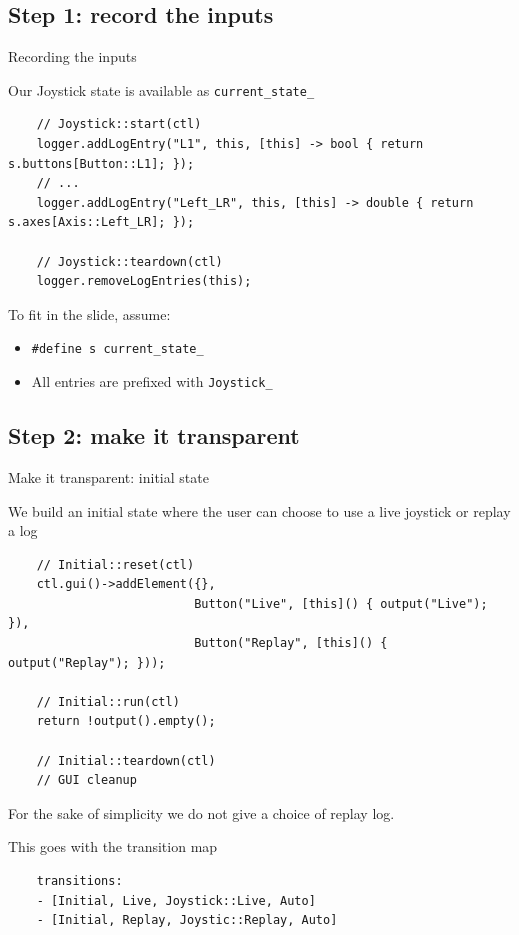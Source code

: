 \documentclass[c,aspectratio=169]{beamer}
\begin{document}
\subsection{Step 1: record the inputs}
\begin{frame}[fragile]{Recording the inputs}
  \begin{block}{Our Joystick state is available as \texttt{current\_state\_}}

  \scriptsize
  \begin{verbatim}
    // Joystick::start(ctl)
    logger.addLogEntry("L1", this, [this] -> bool { return s.buttons[Button::L1]; });
    // ...
    logger.addLogEntry("Left_LR", this, [this] -> double { return s.axes[Axis::Left_LR]; });

    // Joystick::teardown(ctl)
    logger.removeLogEntries(this);
  \end{verbatim}
  \end{block}

  \bigskip

  \hfill To fit in the slide, assume:
  \begin{itemize} \raggedleft
    \item \verb|#define s current_state_|
    \item All entries are prefixed with \verb|Joystick_|
  \end{itemize}
\end{frame}

\subsection{Step 2: make it transparent}
\begin{frame}[fragile]{Make it transparent: initial state}
  \begin{block}{We build an initial state where the user can choose to use a live joystick or replay a log}

  \scriptsize
  \begin{verbatim}
    // Initial::reset(ctl)
    ctl.gui()->addElement({},
                          Button("Live", [this]() { output("Live"); }),
                          Button("Replay", [this]() { output("Replay"); }));

    // Initial::run(ctl)
    return !output().empty();

    // Initial::teardown(ctl)
    // GUI cleanup
  \end{verbatim}
  \end{block}

  \scriptsize
  \hfill For the sake of simplicity we do not give a choice of replay log.

  \normalsize

  \begin{block}{This goes with the transition map}
  \scriptsize
  \begin{verbatim}
    transitions:
    - [Initial, Live, Joystick::Live, Auto]
    - [Initial, Replay, Joystic::Replay, Auto]
  \end{verbatim}
  \end{block}

\end{frame}
\end{document}
